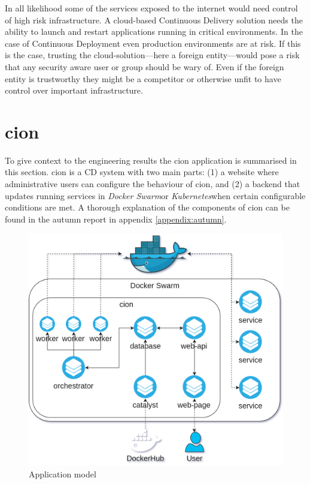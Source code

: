 In all likelihood some of the services exposed to the internet would need control of high risk infrastructure. A cloud-based Continuous Delivery solution needs the ability to launch and restart applications running in critical environments. In the case of Continuous Deployment even production environments are at risk. If this is the case, trusting the cloud-solution---here a foreign entity---would pose a risk that any security aware user or group should be wary of. Even if the foreign entity is trustworthy they might be a competitor or otherwise unfit to have control over important infrastructure.

\section{cion}
To give context to the engineering results the cion application is summarised in this section. cion is a \acrshort{CD} system with two main parts: (1) a website where administrative users can configure the behaviour of cion, and (2) a backend that updates running services in \textit{Docker Swarm}\footnotemark[1] or \textit{Kubernetes}\footnotemark[1] when certain configurable conditions are met. A thorough explanation of the components of cion can be found in the autumn report in appendix \ref{appendix:autumn}.

\begin{figure}[h!]
  \includegraphics[width=\linewidth,height=\textheight,keepaspectratio]{images/domain_model.png}
  \caption{Application model}
  \label{fig:cionmodel}
\end{figure}

